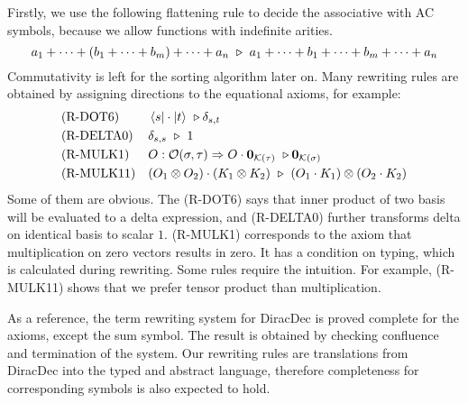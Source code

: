 \documentclass[runningheads]{llncs}
\begin{document}
Firstly, we use the following flattening rule to decide the associative with AC symbols, because we allow functions with indefinite arities.
\[
a_1 + \cdots + (b_1 + \cdots + b_m) + \cdots + a_n
\ \triangleright\ a_1 + \cdots + b_1 + \cdots + b_m + \cdots + a_n
\]
Commutativity is left for the sorting algorithm later on. 
Many rewriting rules are obtained by assigning directions to the equational axioms, for example:
\begin{align*}
    &\textrm{(R-DOT6)} && \bra{s} \cdot \ket{t} \ \triangleright \delta_{s, t} \\
    &\textrm{(R-DELTA0)} && \delta_{s, s} \ \triangleright\ 1 \\
    &\textrm{(R-MULK1)} && O : \mathcal{O}(\sigma, \tau) \Rightarrow O \cdot \mathbf{0}_{\mathcal{K}(\tau)} \ \triangleright \mathbf{0}_{\mathcal{K}(\sigma)} \\
    &\textrm{(R-MULK11)} && (O_1 \otimes O_2) \cdot (K_1 \otimes K_2)\ \triangleright\ (O_1 \cdot K_1) \otimes (O_2 \cdot K_2)
\end{align*}
Some of them are obvious. The (R-DOT6) says that inner product of two basis will be evaluated to a delta expression,
and (R-DELTA0) further transforms delta on identical basis to scalar $1$.
(R-MULK1) corresponds to the axiom that multiplication on zero vectors results in zero. It has a condition on typing, which is calculated during rewriting.
Some rules require the intuition. For example, (R-MULK11) shows that we prefer tensor product than multiplication.

As a reference, the term rewriting system for DiracDec is proved complete for the axioms, except the sum symbol. The result is obtained by checking confluence and termination of the system. Our rewriting rules are translations from DiracDec into the typed and abstract language, therefore completeness for corresponding symbols is also expected to hold.
\end{document}

